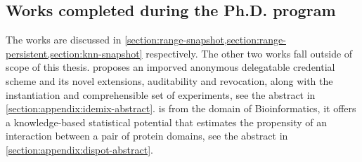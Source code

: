 		\subsection{Works completed during the Ph.D. program}

			\newlength{\citationLength}
			\setlength{\citationLength}{\dimexpr\citationLength+0.5em\relax}
			\begin{description}[
				leftmargin=\dimexpr\citationLength+0.6em\relax,
				labelindent=0pt,
				labelwidth=\citationLength%
			]
				\item[\cite{ore-benchmark-17}] 
				\item[\cite{epsolute}] 
				\item[\cite{k-anon}] 
				\item[\cite{bogatov-idemix-2020}] 
				\item[\cite{dispot}] 
			\end{description}

			The works \cite{ore-benchmark-17,epsolute,k-anon} are discussed in \cref{section:range-snapshot,section:range-persistent,section:knn-snapshot} respectively.
			The other two works \cite{bogatov-idemix-2020,dispot} fall outside of scope of this thesis.
			\cite{bogatov-idemix-2020} proposes an imporved anonymous delegatable credential scheme and its novel extensions, auditability and revocation, along with the instantiation and comprehensible set of experiments, see the abstract in \cref{section:appendix:idemix-abstract}.
			\cite{dispot} is from the domain of Bioinformatics, it offers a knowledge-based statistical potential that estimates the propensity of an interaction between a pair of protein domains, see the abstract in \cref{section:appendix:dispot-abstract}.
